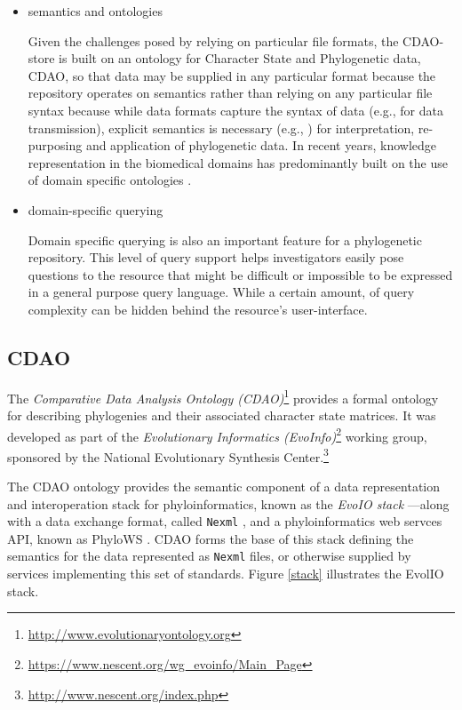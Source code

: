 \documentclass[10pt]{bmc_article}
\newenvironment{bmcformat}{\fussy\setboolean{publ}{true}}{\fussy}
\begin{document}
\begin{bmcformat}
\begin{itemize}
\item semantics and ontologies


Given the challenges posed by relying on particular file formats, the CDAO-store is built on an
ontology for Character State and Phylogenetic data, CDAO, so that data may be supplied in
any particular format because the repository operates on semantics rather than relying on
any particular file syntax because while data formats capture the syntax of data 
(e.g., for data transmission), explicit  semantics is necessary (e.g., \cite{cdao-evol}) for interpretation, 
re-purposing and application of phylogenetic data. In recent years, knowledge representation in 
the biomedical domains has predominantly built on the use of domain
specific ontologies \cite{SK02,Skl01}.

\item domain-specific querying

Domain specific querying is also an important feature for a phylogenetic repository.\cite{queries}
This level of query support helps investigators easily pose questions to the resource that might be
difficult or impossible to be expressed in a general purpose query language. While a certain amount, of
query complexity can be hidden behind the resource's user-interface.



\end{itemize}



\subsection*{CDAO}

  The \emph{Comparative Data Analysis Ontology (CDAO)}\footnote{\url{http://www.evolutionaryontology.org}} \cite{cdao-evol} provides a formal ontology
  for describing phylogenies and their associated
  character state matrices. It was developed as part of the 
  \emph{Evolutionary Informatics (EvoInfo)}\footnote{\url{https://www.nescent.org/wg_evoinfo/Main_Page}} working group, sponsored by 
  the National Evolutionary Synthesis Center.\footnote{\url{http://www.nescent.org/index.php}}
  
  The CDAO ontology provides the semantic component of a data representation and interoperation stack for phyloinformatics, 
  known as the  \emph{EvoIO stack} \cite{evoio}---along with a data exchange format, called {\tt Nexml} \cite{nexml}, and 
  a phyloinformatics web servces API, known as PhyloWS \cite{phylows}. CDAO forms
  the base of this stack defining the semantics for the data represented as {\tt Nexml} files, or otherwise supplied by
  services implementing this set of standards. Figure \ref{stack} illustrates the EvolIO 
  stack.




\end{bmcformat}
\end{document}
